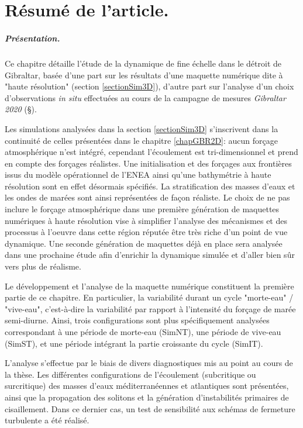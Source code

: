 
\section{Résumé de l'article.}

\subparagraph{Présentation.}
Ce chapitre détaille l'étude de la dynamique de fine échelle dans le détroit de Gibraltar, basée d'une part sur les résultats d'une maquette numérique dite à "haute résolution" (section \ref{sectionSim3D}), d'autre part sur l'analyse d'un choix d'observations \textit{in situ} effectuées au cours de la campagne de mesures \textit{Gibraltar 2020} (\S  {}).

Les simulations analysées dans la section \ref{sectionSim3D} s'inscrivent dans la continuité de celles présentées dans le chapitre \ref{chapGBR2D}: aucun forçage atmosphérique n'est intégré, cependant l'écoulement est tri-dimensionnel et prend en compte des forçages réalistes. Une initialisation et des forçages aux frontières issus du modèle opérationnel de l'ENEA ainsi qu'une bathymétrie à haute résolution sont en effet désormais spécifiés. La stratification des masses d'eaux et les ondes de marées sont ainsi représentées de façon réaliste. Le choix de ne pas inclure le forçage atmosphérique dans une première génération de maquettes numériques à haute résolution vise à simplifier l'analyse des mécanismes et des processus à l'oeuvre dans cette région réputée être très riche d'un point de vue dynamique. Une seconde génération de maquettes déjà en place sera analysée dans une prochaine étude afin d'enrichir la dynamique simulée et d'aller bien sûr vers plus de réalisme. 

Le développement et l'analyse de la maquette numérique constituent la première partie de ce chapitre. En particulier, la variabilité durant un cycle "morte-eau" / "vive-eau", c'est-à-dire la variabilité par rapport à l'intensité du forçage de marée semi-diurne. Ainsi, trois configurations sont plus spécifiquement analysées correspondant à une période de morte-eau (SimNT), une période de vive-eau (SimST), et une période intégrant la partie croissante du cycle (SimIT).

L'analyse s'effectue par le biais de divers diagnostiques mis au point au cours de la thèse. Les différentes configurations de l'écoulement (subcritique ou surcritique) des masses d'eaux méditerranéennes et atlantiques sont présentées, ainsi que la propagation des solitons et la génération d'instabilités primaires de cisaillement. Dans ce dernier cas, un test de sensibilité aux schémas de fermeture turbulente a été réalisé.

